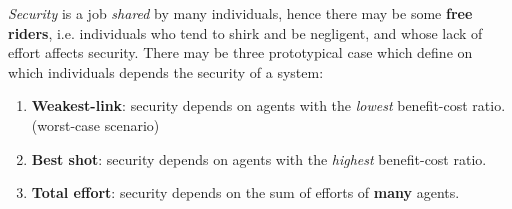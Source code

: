 \textit{Security} is a job \textit{shared} by many individuals,
hence there may be some \textbf{free riders}, i.e. individuals who tend to shirk and be negligent, and whose lack of effort affects security.\nl
There may be three prototypical case which define on which individuals depends the security of a system:
\begin{enumerate}
    \item \textbf{Weakest-link}: security depends on agents with the \textit{lowest} benefit-cost ratio. (worst-case scenario)
    \item \textbf{Best shot}: security depends on agents with the \textit{highest} benefit-cost ratio.
    \item \textbf{Total effort}: security depends on the sum of efforts of \textbf{many} agents.
\end{enumerate}